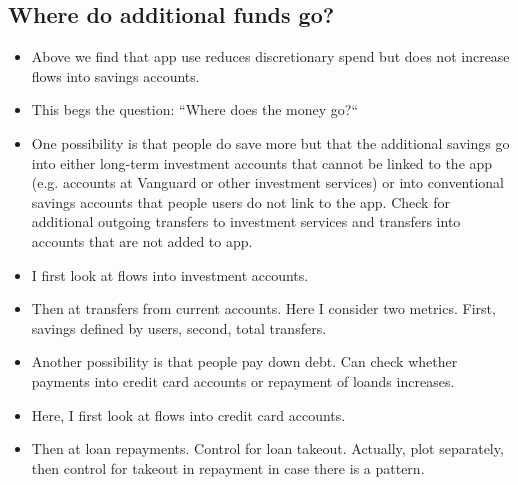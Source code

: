 
\subsection{Where do additional funds go?}%
\label{sub:where_do_additional_funds_go_}

\begin{itemize}
    \item Above we find that app use reduces discretionary spend but does not
        increase flows into savings accounts.

    \item This begs the question: ``Where does the money go?``

    \item One possibility is that people do save more but that the additional
        savings go into either long-term investment accounts that cannot be
        linked to the app (e.g. accounts at Vanguard or other investment
        services) or into conventional savings accounts that people users do
        not link to the app. Check for additional outgoing transfers to
        investment services and transfers into accounts that are not added to
        app.

    \item I first look at flows into investment accounts.

    \item Then at transfers from current accounts. Here I consider two metrics.
        First, savings defined by users, second, total transfers.

    \item Another possibility is that people pay down debt. Can check whether
        payments into credit card accounts or repayment of loands increases.

    \item Here, I first look at flows into credit card accounts.

    \item Then at loan repayments. Control for loan takeout. Actually, plot
        separately, then control for takeout in repayment in case there is a
        pattern.
\end{itemize}

